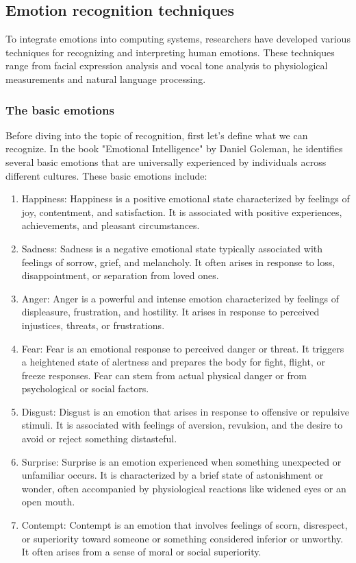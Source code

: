 \subsection{Emotion recognition techniques}
To integrate emotions into computing systems, researchers have developed various techniques for recognizing and interpreting human emotions. 
These techniques range from facial expression analysis and vocal tone analysis to physiological measurements and natural language processing.

\subsubsection{The basic emotions}
Before diving into the topic of recognition, first let's define what we can recognize. In the book "Emotional Intelligence" by Daniel Goleman,
he identifies several basic emotions that are universally experienced by individuals across different cultures.
These basic emotions include:

\begin{enumerate}
    \item Happiness: Happiness is a positive emotional state characterized by feelings of joy, contentment, and satisfaction.
    It is associated with positive experiences, achievements, and pleasant circumstances.
    \item Sadness: Sadness is a negative emotional state typically associated with feelings of sorrow, grief, and melancholy. 
    It often arises in response to loss, disappointment, or separation from loved ones.
    \item Anger: Anger is a powerful and intense emotion characterized by feelings of displeasure, frustration, and hostility.
    It arises in response to perceived injustices, threats, or frustrations.
    \item Fear: Fear is an emotional response to perceived danger or threat. It triggers a heightened state of alertness and prepares the body for fight, flight, or freeze responses. 
    Fear can stem from actual physical danger or from psychological or social factors.
    \item Disgust: Disgust is an emotion that arises in response to offensive or repulsive stimuli. 
    It is associated with feelings of aversion, revulsion, and the desire to avoid or reject something distasteful.
    \item Surprise: Surprise is an emotion experienced when something unexpected or unfamiliar occurs. 
    It is characterized by a brief state of astonishment or wonder, often accompanied by physiological reactions like widened eyes or an open mouth.
    \item Contempt: Contempt is an emotion that involves feelings of scorn, disrespect, or superiority toward someone or something considered inferior or unworthy.
    It often arises from a sense of moral or social superiority.
\end{enumerate}

